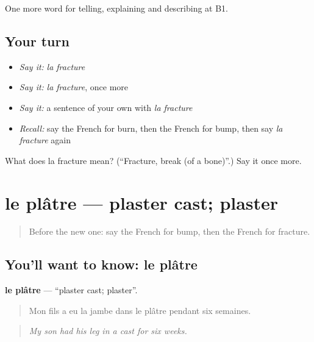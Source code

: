 \begin{grammarlens}[title={What you've built}]
One more word for telling, explaining and describing at B1.
\end{grammarlens}

\subsection*{Your turn}
\begin{itemize}
\raggedright
  \item \emph{Say it:} \emph{la fracture}
  \item \emph{Say it:} \emph{la fracture}, once more
  \item \emph{Say it:} a sentence of your own with \emph{la fracture}
  \item \emph{Recall:} say the French for burn, then the French for bump, then say \emph{la fracture} again
\end{itemize}

\begin{tcolorbox}[breakable,colback=teal!4,colframe=teal!35!black,title={Before you move on}]
What does la fracture mean? (\textquotedblleft{}Fracture, break (of a bone)\textquotedblright{}.) Say it once more.
\end{tcolorbox}
\section[le plâtre]{le plâtre — plaster cast; plaster}

\label{lesson:FR-C480-platre}



\begin{quote}
Before the new one: say the French for bump, then the French for fracture.
\end{quote}

\subsection*{You'll want to know: le plâtre}
\textbf{le plâtre} — \textquotedblleft{}plaster cast; plaster\textquotedblright{}.

\begin{quote}
Mon fils a eu la jambe dans le plâtre pendant six semaines.
\end{quote}

\begin{quote}
\emph{My son had his leg in a cast for six weeks.}
\end{quote}

